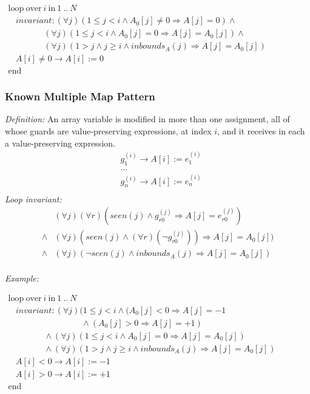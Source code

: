 \documentclass[a4paper,10pt]{article}
\newcommand{\idx}{\ensuremath{i}\xspace}
\newcommand{\at}[1]{{(#1)}}
\newcommand{\KWloop}{\ensuremath{\mathrm{loop}~}}
\newcommand{\KWend}{\ensuremath{\mathrm{end}~}}
\newcommand{\KWover}{\ensuremath{\mathrm{over}~}}
\newcommand{\KWin}{\ensuremath{~\mathrm{in}~}}
\newcommand{\impl}{\ensuremath{\Longrightarrow}}
\newcommand{\inbounds}[2]{\ensuremath{\mathit{inbounds}_{#1}(#2)}\xspace}
\newcommand{\seen}[1]{\ensuremath{\mathit{seen}(#1)}\xspace}
\newcommand{\loopinvariant}{\noindent\textit{Loop invariant:}\xspace}
\newcommand{\patterndef}{\noindent\textit{Definition:}\xspace}
\newcommand{\patternexample}{\noindent\textit{Example:}\xspace}
\begin{document}
\medskip
$\begin{array}{l}
  \KWloop \KWover i \KWin 1~..~N \\
  ~~~~ \textit{invariant}: (\forall j)(1 \leq j < i \land A_0[j] \neq 0 \impl A[j] = 0) \land\\
  ~~~~~~~~~~~~~~~~~~~ (\forall j)(1 \leq j < i \land A_0[j] = 0 \impl A[j] = A_0[j]) \land\\
  ~~~~~~~~~~~~~~~~~~~ (\forall j)(1 > j \land j \geq i \land \inbounds{A}{j} \impl A[j] = A_0[j])\\
  ~~~~ A[i] \neq 0 \rightarrow A[i] := 0\\
  \KWend
\end{array}$

\subsubsection*{Known Multiple Map Pattern}

\patterndef An array variable is modified in more than one assignment, all
of whose guards are value-preserving expressions, at index \idx, and it receives in each a
value-preserving expression.
%
\begin{eqnarray*}
&g_1^\at{\idx} \rightarrow A[\idx] := e_1^\at{\idx}\\
&...\\
&g_n^\at{\idx} \rightarrow A[\idx] := e_n^\at{\idx}\\
\end{eqnarray*}
%
\loopinvariant
%
\begin{eqnarray*}
&(\forall j)(\forall r)(\seen{j} \land g_{r0}^\at{j} \impl A[j] = e_{r0}^\at{j}) \\
\land&(\forall j)(\seen{j} \land (\forall r) (\neg g_{r0}^\at{j})) \impl A[j] = A_0[j]) \\
\land&
 (\forall j)(\neg \seen{j} \land \inbounds{A}{j} \impl A[j] = A_0[j])\\
\end{eqnarray*}

\bigskip
\patternexample

\medskip
$\begin{array}{l}
  \KWloop \KWover i \KWin 1~..~N \\
  ~~~~ \textit{invariant}: (\forall j)(1 \leq j < i \land (A_0[j] < 0 \impl A[j] = -1\\
  ~~~~~~~~~~~~~~~~~~~~~~~~~~~~~~~~~~~~~~~ \land (A_0[j] > 0 \impl A[j] = +1)\\
  ~~~~~~~~~~~~~~~~~~~ \land (\forall j)(1 \leq j < i \land A_0[j] = 0 \impl A[j] = A_0[j])\\
  ~~~~~~~~~~~~~~~~~~~ \land (\forall j)(1 > j \land j \geq i \land \inbounds{A}{j} \impl A[j] = A_0[j])\\
  ~~~~ A[i] < 0 \rightarrow A[i] := -1\\
  ~~~~ A[i] > 0 \rightarrow A[i] := +1\\
  \KWend
\end{array}$
\end{document}

